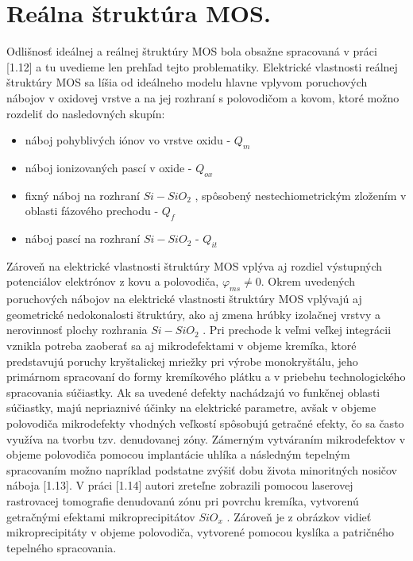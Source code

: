 \section{Reálna štruktúra MOS.}  Odlišnosť ideálnej a reálnej
štruktúry MOS bola obsažne spracovaná v práci [1.12] a tu uvedieme len
prehľad tejto problematiky. Elektrické vlastnosti reálnej štruktúry
MOS sa líšia od ideálneho modelu hlavne vplyvom poruchových nábojov v
oxidovej vrstve a na jej rozhraní s polovodičom a kovom, ktoré možno
rozdeliť do nasledovných skupín:

\begin{itemize}
\item náboj pohyblivých iónov vo vrstve oxidu - $Q_{m}$
\item náboj ionizovaných pascí v oxide - $Q_{ox}$
\item fixný náboj na rozhraní $Si-SiO_2$ , spôsobený nestechiometrickým
  zložením v oblasti fázového prechodu - $Q_f$
\item náboj pascí na rozhraní $Si-SiO_2$  - $Q_{it}$
\end{itemize}

\par Zároveň na elektrické vlastnosti štruktúry MOS vplýva aj rozdiel
výstupných potenciálov elektrónov z kovu a polovodiča, $\varphi_{ms}\neq{0}$.
Okrem uvedených poruchových nábojov na elektrické vlastnosti štruktúry
MOS vplývajú aj geometrické nedokonalosti štruktúry, ako aj zmena
hrúbky izolačnej vrstvy a nerovinnosť plochy rozhrania $Si-SiO_2$ . Pri
prechode k veľmi veľkej integrácii vznikla potreba zaoberať sa aj
mikrodefektami v objeme kremíka, ktoré predstavujú poruchy
kryštalickej mriežky pri výrobe monokryštálu, jeho primárnom
spracovaní do formy kremíkového plátku a v priebehu technologického
spracovania súčiastky. Ak sa uvedené defekty nachádzajú vo funkčnej
oblasti súčiastky, majú nepriaznivé účinky na elektrické parametre,
avšak v objeme polovodiča mikrodefekty vhodných veľkostí spôsobujú
getračné efekty, čo sa často využíva na tvorbu tzv. denudovanej zóny.
Zámerným vytváraním mikrodefektov v objeme polovodiča pomocou
implantácie uhlíka a následným tepelným spracovaním možno napríklad
podstatne zvýšiť dobu života minoritných nosičov náboja [1.13]. V
práci [1.14] autori zreteľne zobrazili pomocou laserovej
rastrovacej tomografie denudovanú zónu pri povrchu kremíka, vytvorenú
getračnými efektami mikroprecipitátov $SiO_x$ . Zároveň je z obrázkov
vidieť mikroprecipitáty v objeme polovodiča, vytvorené pomocou kyslíka
a patričného tepelného spracovania.

